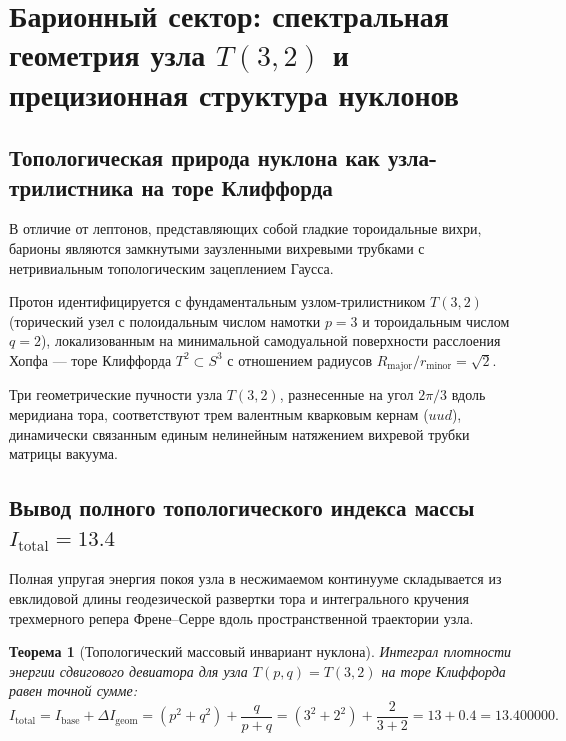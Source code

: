\documentclass[12pt,a4paper]{article}
\newtheorem{theorem}{Теорема}[section]
\theoremstyle{definition}
\theoremstyle{remark}
\begin{document}

\section{Барионный сектор: спектральная геометрия узла $T(3,2)$ и прецизионная структура нуклонов}
\label{sec:baryons}

\subsection{Топологическая природа нуклона как узла-трилистника на торе Клиффорда}
В отличие от лептонов, представляющих собой гладкие тороидальные вихри, барионы являются замкнутыми заузленными вихревыми трубками с нетривиальным топологическим зацеплением Гаусса.

Протон идентифицируется с фундаментальным узлом-трилистником $T(3,2)$ (торический узел с полоидальным числом намотки $p=3$ и тороидальным числом $q=2$), локализованным на минимальной самодуальной поверхности расслоения Хопфа --- торе Клиффорда $T^2 \subset S^3$ с отношением радиусов $R_{\mathrm{major}}/r_{\mathrm{minor}} = \sqrt{2}$.

Три геометрические пучности узла $T(3,2)$, разнесенные на угол $2\pi/3$ вдоль меридиана тора, соответствуют трем валентным кварковым кернам ($uud$), динамически связанным единым нелинейным натяжением вихревой трубки матрицы вакуума.

\subsection{Вывод полного топологического индекса массы $I_{\mathrm{total}} = 13.4$}
Полная упругая энергия покоя узла в несжимаемом континууме складывается из евклидовой длины геодезической развертки тора и интегрального кручения трехмерного репера Френе--Серре вдоль пространственной траектории узла.

\begin{theorem}[Топологический массовый инвариант нуклона]
	Интеграл плотности энергии сдвигового девиатора для узла $T(p,q) = T(3,2)$ на торе Клиффорда равен точной сумме:
	\begin{equation}
		I_{\mathrm{total}} = I_{\mathrm{base}} + \Delta I_{\mathrm{geom}} = (p^2 + q^2) + \frac{q}{p+q} = (3^2 + 2^2) + \frac{2}{3+2} = 13 + 0.4 = 13.400000.
		\label{eq:topological_index_exact}
	\end{equation}
\end{theorem}
\end{document}
